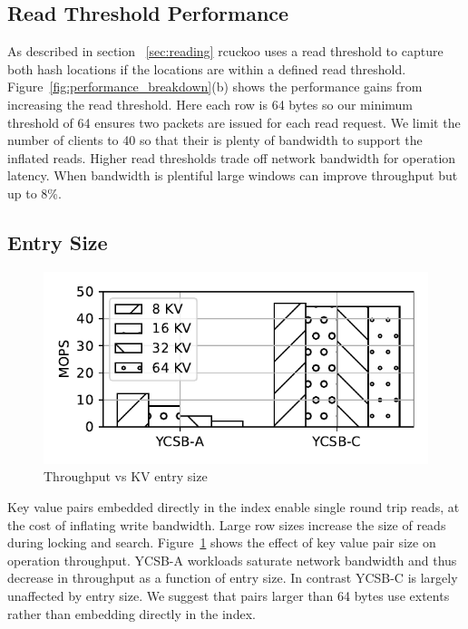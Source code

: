\subsection{Read Threshold Performance}
\label{sec:read_threshold}
As described in section ~\ref{sec:reading} rcuckoo uses a
read threshold to capture both hash locations if the
locations are within a defined read threshold.
Figure~\ref{fig:performance_breakdown}(b) shows the
performance gains from increasing the read threshold. Here
each row is 64 bytes so our minimum threshold of 64 ensures
two packets are issued for each read request. We limit the
number of clients to 40 so that their is plenty of bandwidth
to support the inflated reads. Higher read thresholds trade
off network bandwidth for operation latency. When bandwidth
is plentiful large windows can improve throughput but up to
8\%.



\subsection{Entry Size}
\begin{figure}[ht]
    \includegraphics[width=0.99\linewidth]{fig/entry_size.pdf}
    \caption{Throughput vs KV entry size}
    \label{fig:entry_size}
\end{figure}

Key value pairs embedded directly in the index enable single
round trip reads, at the cost of inflating write bandwidth.
Large row sizes increase the size of reads during locking
and search. Figure~\ref{fig:entry_size} shows the effect of
key value pair size on operation throughput. YCSB-A
workloads saturate network bandwidth and thus decrease in
throughput as a function of entry size. In contrast YCSB-C
is largely unaffected by entry size. We suggest that pairs
larger than 64 bytes use extents rather than embedding
directly in the index.

